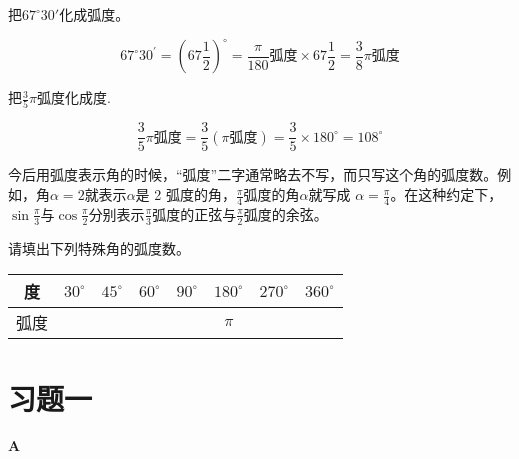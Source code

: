 \begin{example}
    把$67^{\circ}30'$化成弧度。
\end{example}

\begin{solution}
\[67^{\circ}30^{\prime}=\left(67\frac{1}{2}\right)^{\circ}=\frac{\pi}{180}\text{弧度}\times67\frac{1}{2}=\frac{3}{8}\pi\text{弧度}\]
\end{solution}

\begin{example}
    把$\frac{3}{5}\pi$弧度化成度.
\end{example}

\begin{solution}
\[\frac{3}{5}\pi\text{弧度}=\frac{3}{5}(\pi\text{弧度})=\frac{3}{5}\times180^{\circ}=108^{\circ}\]
\end{solution}

\begin{note}
今后用弧度表示角的时候，“弧度”二字通常略去不写，而只写这个角的弧度数。例如，角$\alpha=2$就表示$\alpha$是 2 弧度的角，$\frac\pi4$弧度的角$\alpha$就写成 $\alpha = \frac \pi 4$。在这种约定下， $\sin\frac\pi3$与$\cos\frac\pi2$分别表示$\frac\pi3$弧度的正弦与$\frac\pi2$弧度的余弦。
\end{note}

\begin{ex}
请填出下列特殊角的弧度数。
\begin{center}
\begin{tabular}{c|c|c|c|c|c|c|c}
\hline
度& $30^{\circ}$& $45^{\circ}$& $60^{\circ}$& $90^{\circ}$& $180^{\circ}$& $270^{\circ}$& $360^{\circ}$\\
\hline
弧度 &&&&&$\pi$&&\\
\hline
\end{tabular}
\end{center}
\end{ex}

\section*{习题一}
\begin{center}
    \bfseries A
\end{center}


